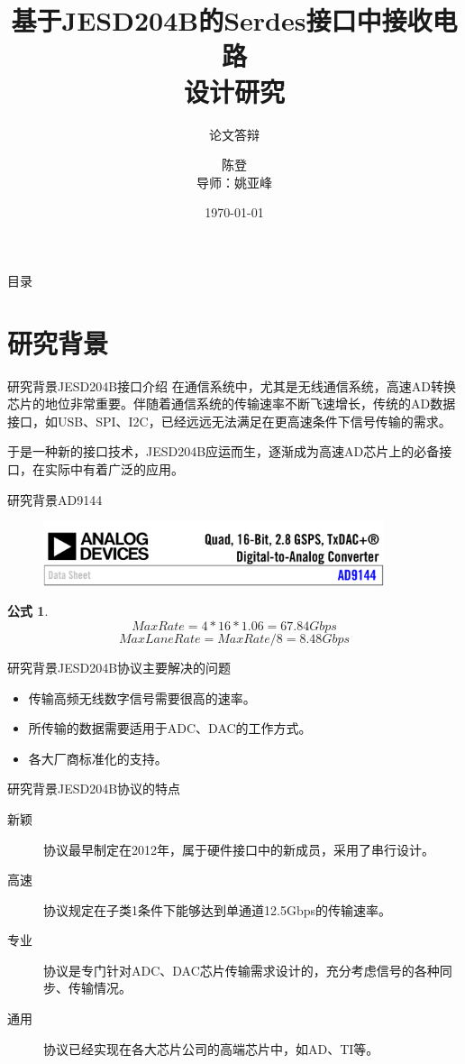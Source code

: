 \documentclass{beamer}
\title{基于JESD204B的Serdes接口中接收电路 \\ 设计研究}
\subtitle{论文答辩}
\author{陈登 \\ 导师：姚亚峰}
\date{\today}
\newtheorem{formula}{公式}
\begin{document}
\begin{frame}
	\titlepage
\end{frame}

\begin{frame}{目录}
	\tableofcontents
\end{frame}

\section{研究背景}

\begin{frame}{研究背景}{JESD204B接口介绍}
在通信系统中，尤其是无线通信系统，高速AD转换芯片的地位非常重要。伴随着通信系统的传输速率不断飞速增长，传统的AD数据接口，如USB、SPI、I2C，已经远远无法满足在更高速条件下信号传输的需求。

于是一种新的接口技术，JESD204B应运而生，逐渐成为高速AD芯片上的必备接口，在实际中有着广泛的应用。
\end{frame}

\begin{frame}{研究背景}{AD9144}
	\begin{figure}
	\includegraphics[width=10cm]{./img/ad9144.png}
	\end{figure}
	\begin{formula}
		$$Max Rate = 4 * 16 * 1.06 = 67.84Gbps$$
		$$Max Lane Rate = Max Rate / 8 = 8.48Gbps$$
	\end{formula}
\end{frame}


\begin{frame}{研究背景}{JESD204B协议主要解决的问题}
  \begin{itemize}
    \item 传输高频无线数字信号需要很高的速率。
    \item 所传输的数据需要适用于ADC、DAC的工作方式。
    \item 各大厂商标准化的支持。
  \end{itemize}
\end{frame}

\begin{frame}{研究背景}{JESD204B协议的特点}
  \begin{description}
    \item [新颖] 协议最早制定在2012年，属于硬件接口中的新成员，采用了串行设计。
    \item [高速] 协议规定在子类1条件下能够达到单通道12.5Gbps的传输速率。
    \item [专业] 协议是专门针对ADC、DAC芯片传输需求设计的，充分考虑信号的各种同步、传输情况。
    \item [通用] 协议已经实现在各大芯片公司的高端芯片中，如AD、TI等。
  \end{description}
\end{frame}
\end{document}
